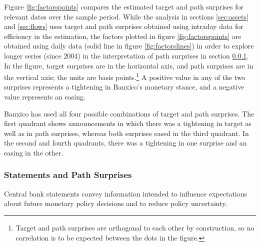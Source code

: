 {Figure \ref{fig:factorspoints} compares the estimated target and path surprises for relevant dates over the sample period. 
While the analysis in sections \ref{sec:assets} and \ref{sec:flows} uses target and path surprises obtained using intraday data for efficiency in the estimation, the factors plotted in figure \ref{fig:factorspoints} are obtained using daily data (solid line in figure \ref{fig:factorslines}) in order to explore longer series (since 2004) in the interpretation of path surprises in section \ref{sec:pathsurprises}. 
In the figure, target surprises are in the horizontal axis, and path surprises are in the vertical axis; the units are basis points.\footnote{Target and path surprises are orthogonal to each other by construction, so no correlation is to be expected between the dots in the figure.}  
A positive value in any of the two surprises represents a tightening in Banxico's monetary stance, and a negative value represents an easing. 

Banxico has used all four possible combinations of target and path surprises. 
The first quadrant shows announcements in which there was a tightening in target as well as in path surprises, whereas both surprises eased in the third quadrant. 
In the second and fourth quadrants, there was a tightening in one surprise and an easing in the other. 



\subsubsection{Statements and Path Surprises} \label{sec:pathsurprises}
Central bank statements convey information intended to influence expectations about future monetary policy decisions and to reduce policy uncertainty. 

}
